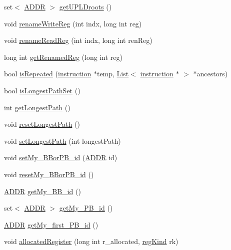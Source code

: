 \begin{DoxyCompactItemize}
set$<$ \hyperlink{binaryTranslator_2global_8h_a8bb6b77b3aab51e3a8d1866dd5861225}{ADDR} $>$ \hyperlink{classinstruction_a31ab0646fc31903f5b192cfc5b7e3aa8}{getUPLDroots} ()
\item 
void \hyperlink{classinstruction_aabd61e186e80af7dd343e0f142741ed6}{renameWriteReg} (int indx, long int reg)
\item 
void \hyperlink{classinstruction_ae9760e334e7829c4f8504bc8436e2dfb}{renameReadReg} (int indx, long int renReg)
\item 
long int \hyperlink{classinstruction_a35b2a3db2dc9a22bbdcbce797d510c85}{getRenamedReg} (long int reg)
\item 
bool \hyperlink{classinstruction_a8d938a7c74c2bd36d0e5565cf933d9d5}{isRepeated} (\hyperlink{classinstruction}{instruction} $\ast$temp, \hyperlink{classList}{List}$<$ \hyperlink{classinstruction}{instruction} $\ast$ $>$ $\ast$ancestors)
\item 
bool \hyperlink{classinstruction_adc11181683114bd444eff11f1a810c89}{isLongestPathSet} ()
\item 
int \hyperlink{classinstruction_af4d93f837096be4e0dd2fe8951b1114e}{getLongestPath} ()
\item 
void \hyperlink{classinstruction_af6d861b0ad792c3136431c3ef99509ba}{resetLongestPath} ()
\item 
void \hyperlink{classinstruction_a46127cea18a5a4ec73566038a2454ecf}{setLongestPath} (int longestPath)
\item 
void \hyperlink{classinstruction_af78c579e9c3b74dfc72c5bbfb573deab}{setMy\_\-BBorPB\_\-id} (\hyperlink{binaryTranslator_2global_8h_a8bb6b77b3aab51e3a8d1866dd5861225}{ADDR} id)
\item 
void \hyperlink{classinstruction_aba1a4de7cc3e25e0090c69c51b15d6b4}{resetMy\_\-BBorPB\_\-id} ()
\item 
\hyperlink{binaryTranslator_2global_8h_a8bb6b77b3aab51e3a8d1866dd5861225}{ADDR} \hyperlink{classinstruction_aee7e5e20a8bbb42a9efe26289a40eb89}{getMy\_\-BB\_\-id} ()
\item 
set$<$ \hyperlink{binaryTranslator_2global_8h_a8bb6b77b3aab51e3a8d1866dd5861225}{ADDR} $>$ \hyperlink{classinstruction_a0e94c2270b46d453299f66a72b7c80de}{getMy\_\-PB\_\-id} ()
\item 
\hyperlink{binaryTranslator_2global_8h_a8bb6b77b3aab51e3a8d1866dd5861225}{ADDR} \hyperlink{classinstruction_a36e1dd2192e97d1c771be8d0f0779d8c}{getMy\_\-first\_\-PB\_\-id} ()
\item 
void \hyperlink{classinstruction_a729d403d579a7f910a6ebfd6500ad5e9}{allocatedRegister} (long int r\_\-allocated, \hyperlink{binaryTranslator_2global_8h_a8981b18ef48c0d2dbf747e5e63e46038}{regKind} rk)

\end{DoxyCompactItemize}
